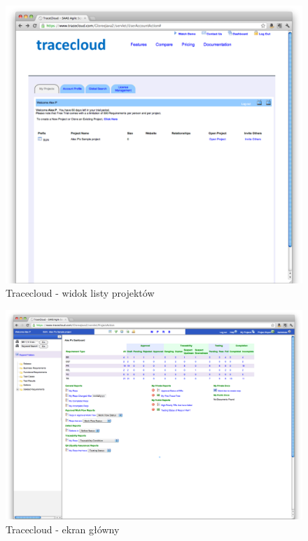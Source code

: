         \begin{figure}[t]
          \centering
          \includegraphics[width=1.0\textwidth]{img/tracecloud_1.pdf}
          \caption{Tracecloud - widok listy projektów}
          \label{fig:tracecloud_1}
        \end{figure}

        \begin{figure}[t]
          \centering
          \includegraphics[width=1.0\textwidth]{img/tracecloud_2.pdf}
          \caption{Tracecloud - ekran główny}
          \label{fig:tracecloud_2}
        \end{figure}

